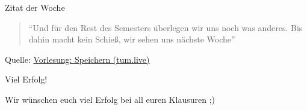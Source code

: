 \documentclass[
  german,            %
  aspectratio=169,    %
]{tumbeamer}
\begin{document}
\begin{frame}[c, fragile]{}{}
	\begin{center}
	  \vspace{0.5cm}
	  \begin{block}{Zitat der Woche}
		\vspace{0.5cm}
		\begin{quote}
		  \enquote{Und für den Rest des Semesters überlegen wir uns noch was anderes. Bis dahin macht kein Schieß, wir sehen uns nächste Woche}
		  \vspace{0.5cm}
		\end{quote}
		\vspace{0.5cm}
	  \end{block}
	  \vspace{0.5cm}
	  Quelle: \href{https://tum.live/w/ws24EidR/50024?t=5988}{Vorlesung: Speichern (tum.live)}
	\end{center}
  \end{frame}

\begin{frame}[c]{Viel Erfolg!}{}
  \begin{center}
	\LARGE Wir wünschen euch viel Erfolg bei all euren Klausuren ;)
  \end{center}
\end{frame}
\end{document}
